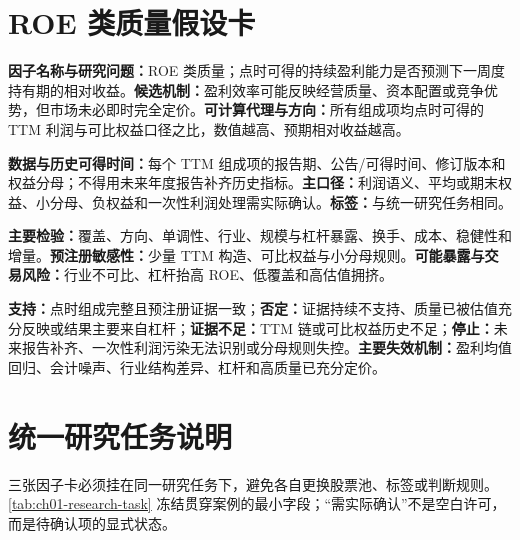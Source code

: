 \section{ROE 类质量假设卡}

\begin{casebox}[title={ROE 类质量假设卡}]
\textbf{因子名称与研究问题：}ROE 类质量；点时可得的持续盈利能力是否预测下一周度持有期的相对收益。\textbf{候选机制：}盈利效率可能反映经营质量、资本配置或竞争优势，但市场未必即时完全定价。\textbf{可计算代理与方向：}所有组成项均点时可得的 TTM 利润与可比权益口径之比，数值越高、预期相对收益越高。

\textbf{数据与历史可得时间：}每个 TTM 组成项的报告期、公告/可得时间、修订版本和权益分母；不得用未来年度报告补齐历史指标。\textbf{主口径：}利润语义、平均或期末权益、小分母、负权益和一次性利润处理需实际确认。\textbf{标签：}与统一研究任务相同。

\textbf{主要检验：}覆盖、方向、单调性、行业、规模与杠杆暴露、换手、成本、稳健性和增量。\textbf{预注册敏感性：}少量 TTM 构造、可比权益与小分母规则。\textbf{可能暴露与交易风险：}行业不可比、杠杆抬高 ROE、低覆盖和高估值拥挤。

\textbf{支持：}点时组成完整且预注册证据一致；\textbf{否定：}证据持续不支持、质量已被估值充分反映或结果主要来自杠杆；\textbf{证据不足：}TTM 链或可比权益历史不足；\textbf{停止：}未来报告补齐、一次性利润污染无法识别或分母规则失控。\textbf{主要失效机制：}盈利均值回归、会计噪声、行业结构差异、杠杆和高质量已充分定价。
\end{casebox}

\section{统一研究任务说明}

三张因子卡必须挂在同一研究任务下，避免各自更换股票池、标签或判断规则。\cref{tab:ch01-research-task} 冻结贯穿案例的最小字段；“需实际确认”不是空白许可，而是待确认项的显式状态。

